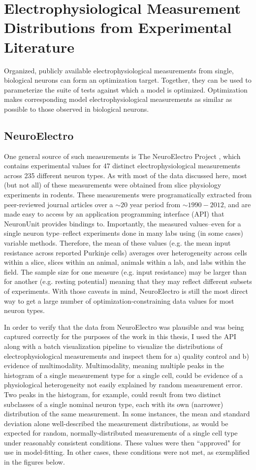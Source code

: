 \section{Electrophysiological Measurement Distributions from Experimental Literature}\label{sec:data-sources}
Organized, publicly available electrophysiological measurements from single, biological neurons can form an optimization target.
Together, they can be used to parameterize the suite of tests against which a model is optimized.
Optimization makes corresponding model electrophysiological measurements as similar as possible to those observed in biological neurons.

\subsection{NeuroElectro}
One general source of such measurements is The NeuroElectro Project \citep{tripathy2014neuroelectro}, which contains experimental values for 47 distinct electrophysiological measurements across 235 different neuron types.
As with most of the data discussed here, most (but not all) of these measurements were obtained from slice physiology experiments in rodents.
These measurements were programatically extracted from peer-reviewed journal articles over a $\sim20$ year period from $\sim1990-2012$,
and are made easy to access by an application programming interface (API) that NeuronUnit provides bindings to.
Importantly, the measured values--even for a single neuron type--reflect experiments done in many labs using (in some cases) variable methods.
Therefore, the mean of these values (e.g. the mean input resistance across reported Purkinje cells) averages over heterogeneity across cells within a slice, slices within an animal, animals within a lab, and labs within the field.
The sample size for one measure (e.g. input resistance) may be larger than for another (e.g. resting potential) meaning that they may reflect different subsets of experiments.
With those caveats in mind, NeuroElectro is still the most direct way to get a large number of optimization-constraining data values for most neuron types.

In order to verify that the data from NeuroElectro was plausible and was being captured correctly for the purposes of the work in this thesis, I used the API along with a batch visualization pipeline to  visualize the distributions of electrophysiological measurements and inspect them for a) quality control and b) evidence of multimodality.
Multimodality, meaning multiple peaks in the histogram of a single measurement type for a single cell, could be evidence of a physiological heterogeneity not easily explained by random measurement error.
Two peaks in the histogram, for example, could result from two distinct subclasses of a single nominal neuron type, each with its own (narrower) distribution of the same measurement.
In some instances, the mean and standard deviation alone well-described the measurement distributions, as would be expected for random, normally-distributed measurements of a single cell type under reasonably consistent conditions.
These values were then ``approved" for use in model-fitting.
In other cases, these conditions were not met, as exemplified in the figures below.

